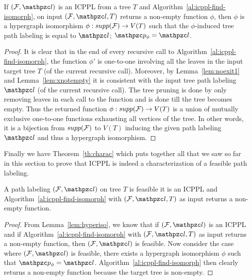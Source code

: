 \begin{lemma}
  \label{lem:hyperiso} %
  If $(\cF, \cl)$ is an ICPPL from a tree $T$ and
  Algorithm~\ref{al:icppl-find-isomorph}, on input $(\cF, \cl, T)$
  returns a non-empty function $\phi$, then $\phi$ is a hypergraph
  isomorphism $\phi : supp({\cal F}) \rightarrow V(T)$ such that the
  $\phi$-induced tree path labeling is equal to $\cl$; $\cp_\phi =
  \cl$.
\end{lemma}
\begin{proof}\thesisspacing
  It is clear that in the end of every recursive call to
  Algorithm~\ref{al:icppl-find-isomorph}, the function $\phi'$ is
  one-to-one involving all the leaves in the input target tree $T$ (of
  the current recursive call). Moreover, by Lemma~\ref{lem:noexit1}
  and Lemma~\ref{lem:xnotempty} it is consistent with the input tree
  path labeling $\cl$ (of the current recursive call). The tree
  pruning is done by only removing leaves in each call to the function
  and is done till the tree becomes empty. Thus the returned function
  $\phi: supp({\cal F}) \rightarrow V(T)$ is a union of mutually exclusive
  one-to-one functions exhausting all vertices of the tree. In other
  words, it is a bijection from $supp({\cal F})$ to $V(T)$ inducing the
  given path labeling $\cl$ and thus a hypergraph isomorphism. %
\end{proof}

Finally we have Theorem~\ref{th:charac} which puts together all that
we saw so far in this section to prove that ICPPL is indeed a
characterization of a feasible path labeling.
\begin{theorem}
  \label{th:charac}
  A path labeling $(\cF, \cl)$ on tree $T$ is feasible \iff it is an
  ICPPL and Algorithm~\ref{al:icppl-find-isomorph} with $(\cF, \cl,
  T)$ as input returns a non-empty function.
\end{theorem}
\begin{proof}\thesisspacing
  From Lemma~\ref{lem:hyperiso}, we know that if $(\cF, \cl)$ is an
  ICPPL and if Algorithm~\ref{al:icppl-find-isomorph} with $(\cF, \cl,
  T)$ as input returns a non-empty function, then $(\cF, \cl)$ is
  feasible.  Now consider the case where $(\cF, \cl)$ is feasible, \ie
  there exists a hypergraph isomorphism $\phi$ such that $\cp_\phi =
  \cl$. 
  Algorithm~\ref{al:icppl-find-isomorph} then clearly returns a non-empty
  function because the target tree is non-empty.%
\end{proof}

